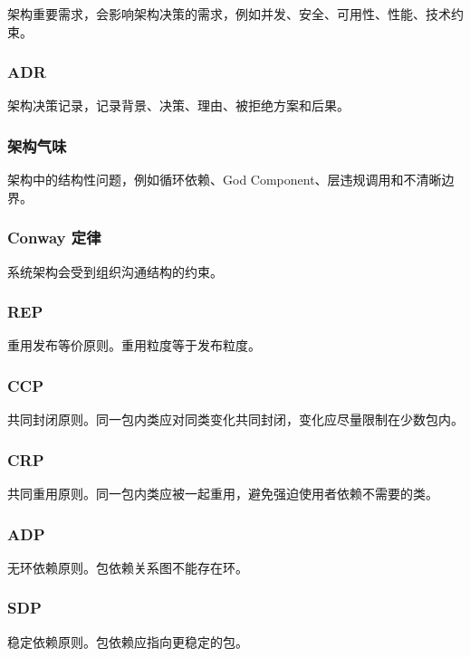 \documentclass[UTF8,zihao=-4]{ctexart}
\begin{document}
架构重要需求，会影响架构决策的需求，例如并发、安全、可用性、性能、技术约束。


\subsubsection*{ADR}


架构决策记录，记录背景、决策、理由、被拒绝方案和后果。


\subsubsection*{架构气味}


架构中的结构性问题，例如循环依赖、God Component、层违规调用和不清晰边界。


\subsubsection*{Conway 定律}


系统架构会受到组织沟通结构的约束。


\subsubsection*{REP}


重用发布等价原则。重用粒度等于发布粒度。


\subsubsection*{CCP}


共同封闭原则。同一包内类应对同类变化共同封闭，变化应尽量限制在少数包内。


\subsubsection*{CRP}


共同重用原则。同一包内类应被一起重用，避免强迫使用者依赖不需要的类。


\subsubsection*{ADP}


无环依赖原则。包依赖关系图不能存在环。


\subsubsection*{SDP}


稳定依赖原则。包依赖应指向更稳定的包。
\end{document}

